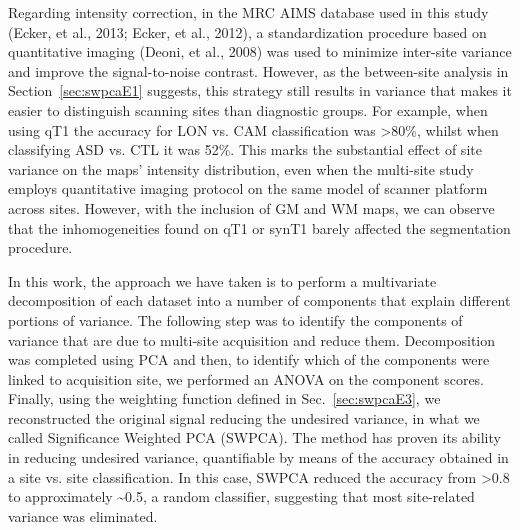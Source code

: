 	Regarding intensity correction, in the MRC AIMS database used in this
	study (Ecker, et al., 2013; Ecker, et al., 2012), a standardization
	procedure based on quantitative imaging (Deoni, et al., 2008) was used
	to minimize inter-site variance and improve the signal-to-noise
	contrast. However, as the between-site analysis in Section~\ref{sec:swpcaE1}
	suggests, this strategy still results in variance that makes it easier
	to distinguish scanning sites than diagnostic groups. For example, when
	using \ac{qT1} the accuracy for LON vs. CAM classification was
	{\textgreater}80\%, whilst when classifying ASD vs. CTL it was 52\%.
	This marks the substantial effect of site variance on the maps’
	intensity distribution, even when the multi-site study employs
	quantitative imaging protocol on the same model of scanner platform
	across sites. However, with the inclusion of \ac{GM} and \ac{WM} maps, we can
	observe that the inhomogeneities found on \ac{qT1} or \ac{synT1} barely affected
	the segmentation procedure. 


	In this work, the approach we have taken is to perform a multivariate
	decomposition of each dataset into a number of components that explain
	different portions of variance. The following step was to identify the
	components of variance that are due to multi-site acquisition and
	reduce them. Decomposition was completed using PCA and then, to
	identify which of the components were linked to acquisition site, we
	performed an ANOVA on the component scores. Finally, using the
	weighting function defined in Sec.~\ref{sec:swpcaE3}, we reconstructed the original
	signal reducing the undesired variance, in what we called Significance
	Weighted PCA (SWPCA). The method has proven its ability in reducing
	undesired variance, quantifiable by means of the accuracy obtained in a
	site vs. site classification. In this case, SWPCA reduced the accuracy
	from {\textgreater}0.8 to approximately \~{}0.5, a random classifier,
	suggesting that most site-related variance was eliminated. 


